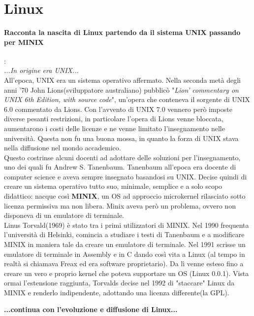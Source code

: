 \documentclass[a4paper]{article}
\begin{document}
	\section{Linux}
		
		\paragraph{Racconta la nascita di Linux partendo da il sistema UNIX passando per MINIX}: \\
		\textit{...In origine era UNIX...}\\
		All'epoca, UNIX era un sistema operativo affermato. Nella seconda metà degli anni '70 John Lions(sviluppatore australiano) pubblicò "\textit{Lion' commentary on UNIX 6th Edition, with source code}", un'opera che conteneva il sorgente di UNIX 6.0 commentato da Lions. Con l'avvento di UNIX 7.0 vennero però imposte diverse pesanti restrizioni, in particolare l'opera di Lions venne bloccata, aumentarono i costi delle licenze e ne venne limitato l'insegnamento nelle università. Questa non fu una buona mossa, in quanto la forza di UNIX stava nella diffusione nel mondo accademico.\\
		Questo costrinse alcuni docenti ad adottare delle soluzioni per l'insegnamento, uno dei quali fu Andrew S. Tanenbaum.
		Tanenbaum all'epoca era docente di computer science e aveva sempre insegnato basandosi su UNIX. Decise quindi di creare un sistema operativo tutto suo,  minimale, semplice e a solo scopo didattico: nacque così \textbf{MINIX}, un OS ad approccio microkernel rilasciato sotto licenza permissiva ma non libera.
		Minix aveva però un problema, ovvero non disponeva di un emulatore di terminale.\\
		Linus Torvald(1969) è stato tra i primi utilizzatori di MINIX. Nel 1990 frequenta l'università di Helsinki, comincia a studiare i testi di Tanenbaum e a modificare MINIX in maniera tale da creare un emulatore di terminale. Nel 1991 scrisse un emulatore di terminale in Assembly e in C dando così vita a Linux (al tempo in realtà si chiamava Freax ed era software proprietario). Da lì venne esteso fino a creare un vero e proprio kernel che poteva supportare un OS (Linux 0.0.1). Vista ormai l'estensione raggiunta, Torvalds decise nel 1992 di "staccare" Linux da MINIX e renderlo indipendente, adottando una licenza differente(la GPL).
		
		\textbf{...continua con l'evoluzione e diffusione di Linux...}
		
		
\end{document}
